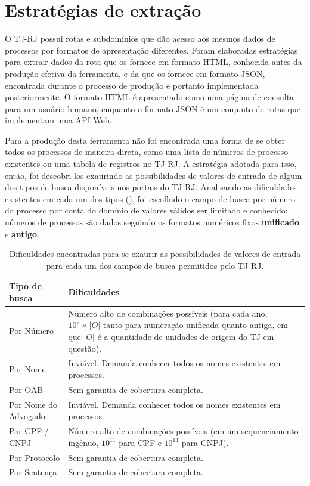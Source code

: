 \section{Estratégias de extração}

O TJ-RJ possui rotas e subdomínios que dão acesso aos mesmos dados de processos
por formatos de apresentação diferentes. Foram elaboradas estratégias para
extrair dados da rota que os fornece em formato HTML, conhecida antes da
produção efetiva da ferramenta, e da que os fornece em formato JSON, encontrada
durante o processo de produção e portanto implementada posteriormente. O
formato HTML é apresentado como uma página de consulta para um usuário humano,
enquanto o formato JSON é um conjunto de rotas que implementam uma API Web.

Para a produção desta ferramenta não foi encontrada uma forma de se obter todos
os processos de maneira direta, como uma lista de números de processo
existentes ou uma tabela de registros no TJ-RJ. A estratégia adotada para isso,
então, foi descobri-los exaurindo as possibilidades de valores de entrada de
algum dos tipos de busca disponíveis nos portais do TJ-RJ. Analisando as
dificuldades existentes em cada um dos tipos
(), foi escolhido o campo de busca por
número do processo por conta do domínio de valores válidos ser limitado e
conhecido: números de processos são dados seguindo os formatos numéricos fixos
\textbf{unificado} e \textbf{antigo}.

\begin{table}[htb]
    \centering
    \begin{tabular}{lp{}}
        \toprule
        Tipo de busca & Dificuldades \\
        \midrule
        Por Número & Número alto de combinações possíveis (para cada ano,
                     $10^{7} \times |O|$ tanto para numeração unificada quanto
                     antiga, em que $|O|$ é a quantidade de unidades de origem
                     do TJ em questão). \\
        Por Nome & Inviável. Demanda conhecer todos os nomes existentes em processos. \\
        Por OAB & Sem garantia de cobertura completa. \\
        Por Nome do Advogado & Inviável. Demanda conhecer todos os nomes existentes em processos. \\
        Por CPF / CNPJ & Número alto de combinações possíveis (em um sequenciamento ingênuo, $10^{11}$ para CPF e $10^{14}$ para CNPJ). \\
        Por Protocolo & Sem garantia de cobertura completa. \\
        Por Sentença & Sem garantia de cobertura completa. \\
        \bottomrule
    \end{tabular}
    \caption{%
        Dificuldades encontradas para se exaurir as possibilidades de valores
        de entrada para cada um dos campos de busca permitidos pelo TJ-RJ.
    }
    \label{tbl:dificuldades-tipos-de-busca}
\end{table}

